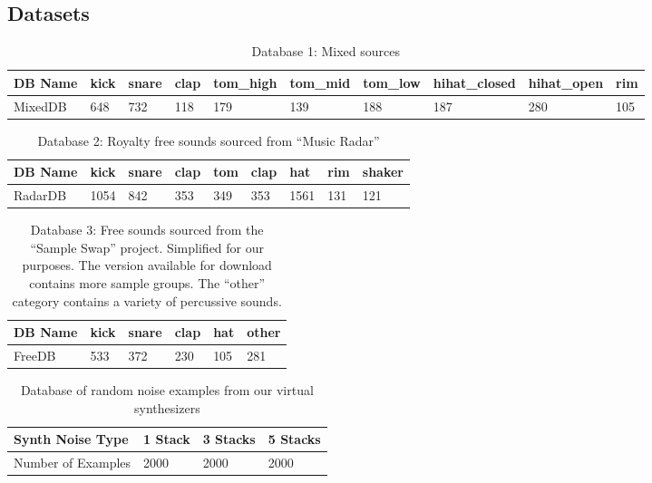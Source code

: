 \documentclass[runningheads,a4paper]{llncs}
\begin{document}


\begin{appendices}
\chapter{Datasets}
\label{appendix:A}
\begin{table}[h!]
\centering
\begin{tabular}[width=\paperwidth]{|l|l|l|l|l|l|l|l|l|l|}
\hline
DB Name & kick & snare & clap & tom\_high & tom\_mid & tom\_low & hihat\_closed &  hihat\_open & rim \\ \hline
MixedDB & 648 & 732 & 118 & 179 & 139 &  188 & 187 & 280 & 105 \\\hline
\end{tabular}
\caption{Database 1: Mixed sources}
\label{db:self}
\end{table}

\begin{table}[h!]
\centering
\begin{tabular}{|l|l|l|l|l|l|l|l|l|}
\hline
DB Name & kick & snare & clap & tom & clap & hat & rim & shaker  \\ \hline
RadarDB & 1054 & 842   & 353 & 349 &  353 & 1561& 131 & 121 \\ \hline
\end{tabular}
\caption{Database 2: Royalty free sounds sourced from \enquote{Music Radar}}
\label{db:radar}
\end{table}

\begin{table}[h!]
\centering
\begin{tabular}{|l|l|l|l|l|l|}
\hline
 DB Name & kick & snare & clap & hat & other \\\hline
 FreeDB & 533 & 372 & 230 & 105 & 281 \\ \hline
\end{tabular}
\caption{Database 3: Free sounds sourced from the \enquote{Sample Swap} project. Simplified for our purposes. The version available for download contains more sample groups. The \enquote{other} category contains a variety of percussive sounds.}
\label{db:sampleswap}
\end{table}


\begin{table}[h!]
\centering
\begin{tabular}{|l|l|l|l|}
\hline
 Synth Noise Type & 1 Stack & 3 Stacks  & 5 Stacks \\ \hline
 Number of Examples & 2000 & 2000 & 2000 \\ \hline
\end{tabular}
\caption{Database of random noise examples from our virtual synthesizers}
\label{db:noise}
\end{table}


\end{appendices}
\end{document}
